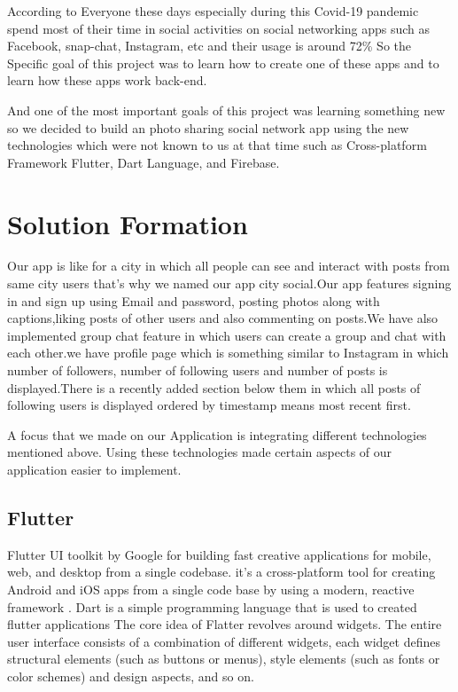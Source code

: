 According to \cite{COVID19-SocialMediaUsage:online} Everyone these days especially during this Covid-19 pandemic spend most of their time in social activities on social networking apps such as Facebook, snap-chat, Instagram, etc and their usage is around 72\%  So the Specific goal of this project was to learn how to create one of these apps and to learn how these apps work back-end.

And one of the most important goals of this project was learning something new so we decided to build an photo sharing social network app using the new technologies which were not known to us at that time such as Cross-platform Framework Flutter, Dart Language, and Firebase.
\section{Solution Formation}
Our app is like for a city in which all people can see and interact with posts from same city users that's why we named our app city social.Our app features signing in and sign up using Email and password, posting photos along with captions,liking posts of other users and also commenting on posts.We have also implemented group chat feature in which users can create a group and chat with each other.we have profile page which is something similar to Instagram in which number of followers, number of following users and number of posts is displayed.There is a recently added section below them in which all posts of following users is displayed ordered by timestamp means most recent first.

A focus that we made on our Application is integrating different technologies mentioned above. Using these technologies made certain aspects of our application easier to implement.

\subsection{Flutter}

Flutter UI toolkit by Google for building fast creative applications for mobile, web, and desktop from a single codebase. it’s a cross-platform tool for creating Android and iOS apps from a single code base by using a modern, reactive framework \cite{WhatisFl74:online}. Dart is a simple programming language that is used to created flutter applications The core idea of Flatter revolves around widgets. The entire user interface consists of a combination of different widgets, each widget defines structural elements (such as buttons or menus), style elements (such as fonts or color schemes) and design aspects, and so on.

